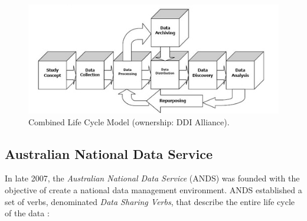 \begin{figure}
    \center
    \includegraphics[width=\textwidth]{img/data_lifecycle/what-is-ddi-diagram.jpg}
    \caption{Combined Life Cycle Model (ownership: DDI Alliance).}
    \label{fig:ddi}
\end{figure}


\subsection{Australian National Data Service}

In late 2007, the \textit{Australian National Data Service} (ANDS) was founded with the objective of create a national data management environment. ANDS established a set of verbs, denominated \textit{Data Sharing Verbs}, that describe the entire life cycle of the data \cite{burton_designing_2009}:

